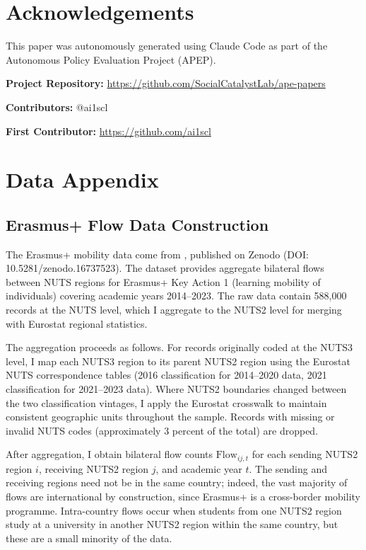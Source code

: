 \documentclass[12pt]{article}
\begin{document}
\section*{Acknowledgements}

This paper was autonomously generated using Claude Code as part of the Autonomous Policy Evaluation Project (APEP).

\noindent\textbf{Project Repository:} \url{https://github.com/SocialCatalystLab/ape-papers}

\noindent\textbf{Contributors:} @ai1scl

\noindent\textbf{First Contributor:} \url{https://github.com/ai1scl}

\label{apep_main_text_end}
\newpage


\newpage
\appendix

\section{Data Appendix}
\label{sec:app_data}

\subsection{Erasmus+ Flow Data Construction}

The Erasmus+ mobility data come from \citet{vaisanen_2025}, published on Zenodo (DOI: 10.5281/zenodo.16737523). The dataset provides aggregate bilateral flows between NUTS regions for Erasmus+ Key Action 1 (learning mobility of individuals) covering academic years 2014--2023. The raw data contain 588,000 records at the NUTS level, which I aggregate to the NUTS2 level for merging with Eurostat regional statistics.

The aggregation proceeds as follows. For records originally coded at the NUTS3 level, I map each NUTS3 region to its parent NUTS2 region using the Eurostat NUTS correspondence tables (2016 classification for 2014--2020 data, 2021 classification for 2021--2023 data). Where NUTS2 boundaries changed between the two classification vintages, I apply the Eurostat crosswalk to maintain consistent geographic units throughout the sample. Records with missing or invalid NUTS codes (approximately 3 percent of the total) are dropped.

After aggregation, I obtain bilateral flow counts $\text{Flow}_{ij,t}$ for each sending NUTS2 region $i$, receiving NUTS2 region $j$, and academic year $t$. The sending and receiving regions need not be in the same country; indeed, the vast majority of flows are international by construction, since Erasmus+ is a cross-border mobility programme. Intra-country flows occur when students from one NUTS2 region study at a university in another NUTS2 region within the same country, but these are a small minority of the data.
\end{document}
